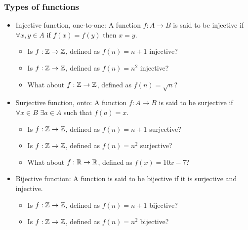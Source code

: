  \begin{frame}[fragile]
\frametitle{Types of functions}
\begin{itemize}
\item Injective function, one-to-one: A function $f: A \rightarrow B$ is said to be injective if $\forall x,y \in A$ if $f(x)=f(y)$ then $x =y$.\\


\begin{itemize}
\item Is $f: {{\mathbb{Z}}} \rightarrow {{\mathbb{Z}}}$, defined as $f(n) = n+1$ injective?

\item Is $f: {{\mathbb{Z}}} \rightarrow {{\mathbb{Z}}}$, defined as $f(n) = n^2$ injective?

\item What about $f: {{\mathbb{Z}}} \rightarrow {{\mathbb{Z}}}$, defined as $f(n) = \sqrt{n}$?

\end{itemize}


\item Surjective function, onto: A function $f: A \rightarrow B$ is said to be surjective if $\forall x\in B$ 
$\exists a \in A$ such that $f(a)=x$. \\


\begin{itemize}
\item Is $f: {{\mathbb{Z}}} \rightarrow {{\mathbb{Z}}}$, defined as $f(n) = n+1$ surjective?

\item Is $f: {{\mathbb{Z}}} \rightarrow {{\mathbb{Z}}}$, defined as $f(n) = n^2$ surjective?

\item What about $f: {{\mathbb{R}}} \rightarrow {{\mathbb{R}}}$, defined as $f(x) = 10x - 7$?

\end{itemize}


\item Bijective function: A function is said to be bijective if it is surjective and injective. \\


\begin{itemize}
\item Is $f: {{\mathbb{Z}}} \rightarrow {{\mathbb{Z}}}$, defined as $f(n) = n+1$ bijective?

\item Is $f: {{\mathbb{Z}}} \rightarrow {{\mathbb{Z}}}$, defined as $f(n) = n^2$ bijective?


\end{itemize}
\end{itemize}
\end{frame}
